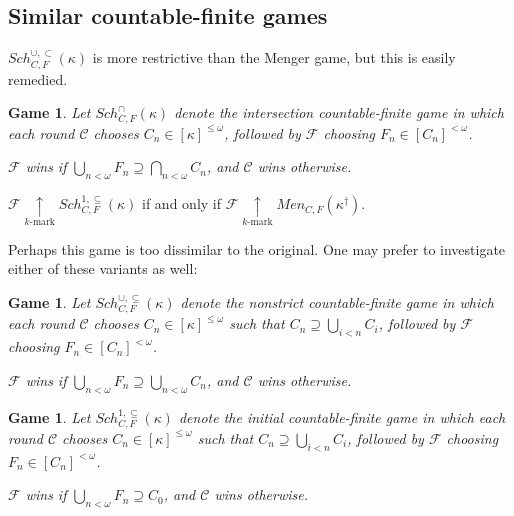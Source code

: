 \documentclass{beamer}
\theoremstyle{example}
\newtheorem{game}[theorem]{Game}
\theoremstyle{definition}
\newcommand{\kmarkwin}[1]{\underset{#1\text{-mark}}{\uparrow}}
\newcommand{\oneptlind}[1]{#1^\dagger} %
\newcommand{\menGame}[1]{Men_{C,F}\left({#1}\right)}
\newcommand{\schFillStrictGame}[1]{Sch^{\cup,\subset}_{C,F}\left({#1}\right)}
\newcommand{\schFillGame}[1]{Sch^{\cup,\subseteq}_{C,F}\left({#1}\right)}
\newcommand{\schFillInitialGame}[1]{Sch^{1,\subseteq}_{C,F}\left({#1}\right)}
\newcommand{\schFillIntGame}[1]{Sch^{\cap}_{C,F}\left({#1}\right)}
\newcommand{\<}{\langle}
\renewcommand{\>}{\rangle}
\newcommand{\pl}[1]{\mathscr{#1}}
\newcommand{\term}{\textit}
\begin{document}
\subsection{Similar countable-finite games}

\begin{frame}
  \(\schFillStrictGame\kappa\) is more restrictive than the Menger game,
  but this is easily remedied.

  \begin{game}
    Let \(\schFillIntGame\kappa\) denote the
    \term{intersection countable-finite game}
    in which each round \(\pl C\) chooses \(C_n\in[\kappa]^{\leq\omega}\),
    followed by \(\pl F\) choosing \(F_n\in[C_n]^{<\omega}\).

    \(\pl F\) wins if \(\bigcup_{n<\omega}F_n\supseteq \bigcap_{n<\omega}C_n\),
    and \(\pl C\) wins otherwise.
  \end{game}

  \pause

  \begin{theorem}
    \(\pl F\kmarkwin{k}\schFillInitialGame\kappa\) if and only if
    \(\pl F\kmarkwin{k}\menGame{\oneptlind\kappa}\).
  \end{theorem}
\end{frame}

\begin{frame}
  Perhaps this game is too dissimilar to the original. One may prefer
  to investigate either of these variants as well:

  \pause

  \begin{game}
    Let \(\schFillGame\kappa\) denote the
    \term{nonstrict countable-finite game}
    in which each round \(\pl C\) chooses \(C_n\in[\kappa]^{\leq\omega}\)
    such that \(C_n\supseteq \bigcup_{i<n}C_i\),
    followed by \(\pl F\) choosing \(F_n\in[C_n]^{<\omega}\).

    \(\pl F\) wins if \(\bigcup_{n<\omega}F_n\supseteq \bigcup_{n<\omega}C_n\),
    and \(\pl C\) wins otherwise.
  \end{game}

  \begin{game}
    Let \(\schFillInitialGame\kappa\) denote the
    \term{initial countable-finite game}
    in which each round \(\pl C\) chooses \(C_n\in[\kappa]^{\leq\omega}\)
    such that \(C_n\supseteq \bigcup_{i<n}C_i\),
    followed by \(\pl F\) choosing \(F_n\in[C_n]^{<\omega}\).

    \(\pl F\) wins if \(\bigcup_{n<\omega}F_n\supseteq C_0\),
    and \(\pl C\) wins otherwise.
  \end{game}
\end{frame}
\end{document}
